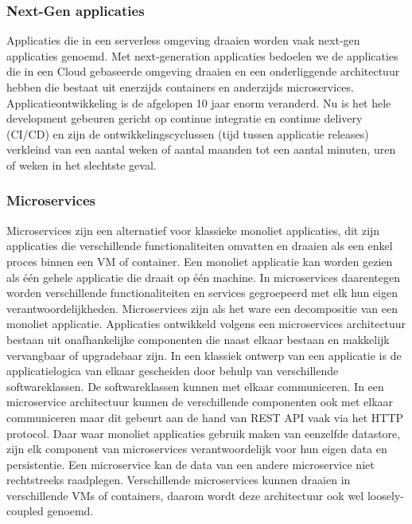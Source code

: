\subsubsection{Next-Gen applicaties}
Applicaties die in een serverless omgeving draaien worden vaak next-gen applicaties genoemd. Met next-generation applicaties bedoelen we de applicaties die in een Cloud gebaseerde omgeving draaien en een onderliggende architectuur hebben die bestaat uit enerzijds containers en anderzijds microservices. Applicatieontwikkeling is de afgelopen 10 jaar enorm veranderd. Nu is het hele development gebeuren gericht op continue integratie en continue delivery (CI/CD) en zijn de ontwikkelingscyclussen (tijd tussen applicatie releases) verkleind van een aantal weken of aantal maanden tot een aantal minuten, uren of weken in het slechtste geval. 

\subsubsection{Microservices}
Microservices zijn een alternatief voor klassieke monoliet applicaties, dit zijn applicaties die verschillende functionaliteiten omvatten en draaien als een enkel proces binnen een VM of container. Een monoliet applicatie kan worden gezien als één gehele applicatie die draait op één machine.  In microservices daarentegen worden verschillende functionaliteiten en services gegroepeerd met elk hun eigen verantwoordelijkheden. Microservices zijn als het ware  een decompositie van een monoliet applicatie. Applicaties ontwikkeld volgens een microservices architectuur bestaan uit onafhankelijke componenten die naast elkaar bestaan en makkelijk vervangbaar of upgradebaar zijn. In een klassiek ontwerp van een applicatie is de applicatielogica van elkaar gescheiden door behulp van verschillende softwareklassen. De softwareklassen kunnen met elkaar communiceren. In een microservice architectuur kunnen de verschillende componenten ook met elkaar communiceren maar dit gebeurt aan de hand van REST API vaak via het HTTP protocol. Daar waar monoliet applicaties gebruik maken van eenzelfde datastore, zijn elk component van microservices verantwoordelijk voor hun eigen data en persistentie. Een microservice kan de data van een andere microservice niet rechtstreeks raadplegen. Verschillende microservices kunnen draaien in verschillende VMs of containers, daarom wordt deze architectuur ook wel loosely-coupled genoemd.\autocite{Fowler2014}

